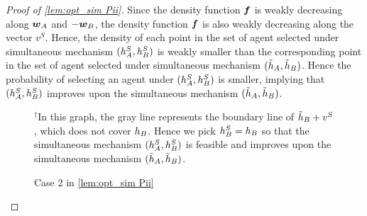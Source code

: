 \begin{proof}[Proof of \cref{lem:opt_sim Pii}]
Since the density function $\boldsymbol{f}$ is weakly decreasing along  $\boldsymbol{w}_A$ and $-\boldsymbol{w}_B$, 
the density function $\boldsymbol{f}$ is also weakly decreasing along the vector $v^S$. 
Hence, 
the density of each point in the set of agent selected under simultaneous mechanism $(h_A^S,h_B^S)$ is weakly smaller than the corresponding point in the set of agent selected under simultaneous mechanism $(\tilde{h}_A,\tilde{h}_B)$.
    Hence the probability of selecting an agent under  $(h_A^S,h_B^S)$ is smaller, implying that  $(h_A^S,h_B^S)$ improves upon the simultaneous mechanism $(\tilde{h}_A,\tilde{h}_B)$.

\begin{figure}[t]
\centering
{}
\caption{Case 2 in \cref{lem:opt_sim Pii}}
\label{fig: Pii case 2}
\rule{0in}{1.2em}$^\dag$\scriptsize In this graph, the gray line represents the boundary line of $\tilde{h}_B+v^S$, which does not cover
$h_B$. Hence we pick $h_B^S=h_B$ so that  the simultaneous mechanism $(h_A^S,h_B^S)$ is feasible and improves upon the simultaneous mechanism $(\tilde{h}_A,\tilde{h}_B)$.
\end{figure}


\end{proof}
